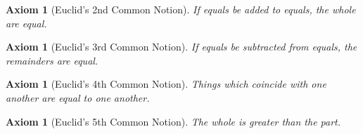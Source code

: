 \documentclass[letterpaper, 12pt]{amsart}
\newtheorem{axe}[thm]{Axiom}
\theoremstyle{definition}  %
\begin{document}
		\begin{axe}[Euclid's 2nd Common Notion]
		If equals be added to equals, the whole are equal.
		\end{axe}

		\begin{axe}[Euclid's 3rd Common Notion]
		If equals be subtracted from equals, the remainders are equal.
		\end{axe}

		\begin{axe}[Euclid's 4th Common Notion]
		Things which coincide with one another are equal to one another.
		\end{axe}

		\begin{axe}[Euclid's 5th Common Notion]
		The whole is greater than the part.
		\end{axe}
\end{document}
